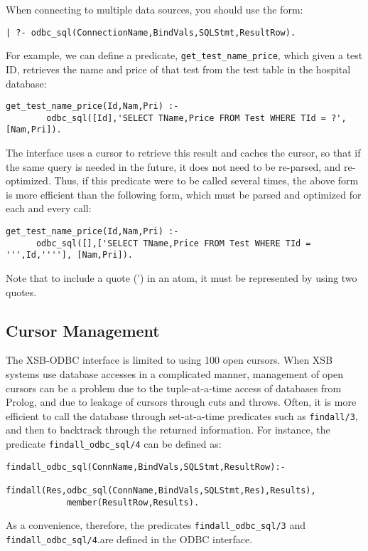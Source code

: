 When connecting to multiple data sources, you should use the form:

\begin{verbatim}
| ?- odbc_sql(ConnectionName,BindVals,SQLStmt,ResultRow).
\end{verbatim}

For example, we can define a predicate, {\tt get\_test\_name\_price},
which given a test ID, retrieves the name and price of that test from
the test table in the hospital database:

\begin{verbatim}
get_test_name_price(Id,Nam,Pri) :-
        odbc_sql([Id],'SELECT TName,Price FROM Test WHERE TId = ?', [Nam,Pri]).
\end{verbatim}

The interface uses a cursor to retrieve this result and caches the
cursor, so that if the same query is needed in the future, it does not
need to be re-parsed, and re-optimized.  Thus, if this predicate were
to be called several times, the above form is more efficient than the
following form, which must be parsed and optimized for each and every
call:

\begin{verbatim}
get_test_name_price(Id,Nam,Pri) :-
      odbc_sql([],['SELECT TName,Price FROM Test WHERE TId = ''',Id,''''], [Nam,Pri]).
\end{verbatim}

Note that to include a quote (') in an atom, it must be represented
by using two quotes.

\subsection{Cursor Management} \label{odbc:cursors}

The XSB-ODBC interface is limited to using 100 open cursors.  When XSB
systems use database accesses in a complicated manner, management of
open cursors can be a problem due to the tuple-at-a-time access of
databases from Prolog, and due to leakage of cursors through cuts and
throws.  Often, it is more efficient to call the database through
set-at-a-time predicates such as {\tt findall/3}, and then to
backtrack through the returned information.  For instance, 
the predicate {\tt findall\_odbc\_sql/4} can be defined as:
%
\begin{verbatim}
findall_odbc_sql(ConnName,BindVals,SQLStmt,ResultRow):- 
            findall(Res,odbc_sql(ConnName,BindVals,SQLStmt,Res),Results),
            member(ResultRow,Results).
\end{verbatim}
%
As a convenience, therefore, the predicates {\tt findall\_odbc\_sql/3}
and {\tt findall\_odbc\_sql/4}.are defined in the ODBC interface.


